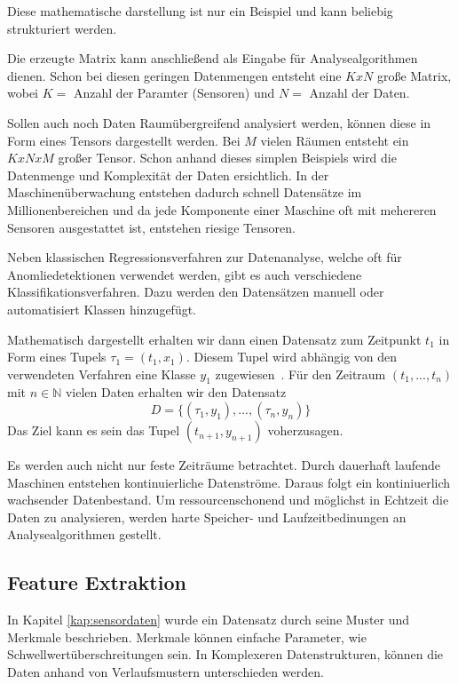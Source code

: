 Diese mathematische darstellung ist nur ein Beispiel und kann beliebig strukturiert werden.

Die erzeugte Matrix kann anschließend als Eingabe für Analysealgorithmen dienen.
Schon bei diesen geringen Datenmengen entsteht eine $K x N $ große Matrix, wobei $K=$ Anzahl der Paramter (Sensoren) und $N=$ Anzahl der Daten.

Sollen auch noch Daten Raumübergreifend analysiert werden, können diese in Form eines Tensors dargestellt werden. Bei $M$ vielen Räumen entsteht ein $K x N x M$ großer Tensor.
Schon anhand dieses simplen Beispiels wird die Datenmenge und Komplexität der Daten ersichtlich.
In der Maschinenüberwachung entstehen dadurch schnell Datensätze im Millionenbereichen und da jede Komponente einer Maschine oft mit mehereren Sensoren ausgestattet ist, entstehen riesige Tensoren.

Neben klassischen Regressionsverfahren zur Datenanalyse, welche oft für Anomliedetektionen verwendet werden, gibt es auch verschiedene Klassifikationsverfahren. Dazu werden den Datensätzen manuell oder automatisiert Klassen hinzugefügt.

Mathematisch dargestellt erhalten wir dann einen Datensatz zum Zeitpunkt $t_1$ in Form eines Tupels $\tau_1=(t_1,x_1)$. Diesem Tupel wird abhängig von den verwendeten Verfahren eine Klasse $y_1$ zugewiesen~\cite{gay2013feature}. Für den Zeitraum $(t_1,...,t_n)$ mit $n \in \mathbb{N}$ vielen Daten erhalten wir den Datensatz 
\begin{equation}
  D=\{ (\tau_1,y_1), ... , (\tau_n,y_n) \}
  \label{equ:trainingset}
\end{equation}
Das Ziel kann es sein das Tupel $(t_{n+1},y_{n+1})$ voherzusagen.

Es werden auch nicht nur feste Zeiträume betrachtet. 
Durch dauerhaft laufende Maschinen entstehen kontinuierliche Datenströme.
Daraus folgt ein kontiniuerlich wachsender Datenbestand.
Um ressourcenschonend und möglichst in Echtzeit die Daten zu analysieren, werden harte Speicher- und Laufzeitbedinungen an Analysealgorithmen gestellt.


\subsection{Feature Extraktion}\label{kap:featureextraktionuebersicht}
In Kapitel \ref{kap:sensordaten} wurde ein Datensatz durch seine Muster und Merkmale beschrieben. Merkmale können einfache Parameter, wie Schwellwertüberschreitungen sein. In Komplexeren Datenstrukturen, können die Daten anhand von Verlaufsmustern unterschieden werden. 

